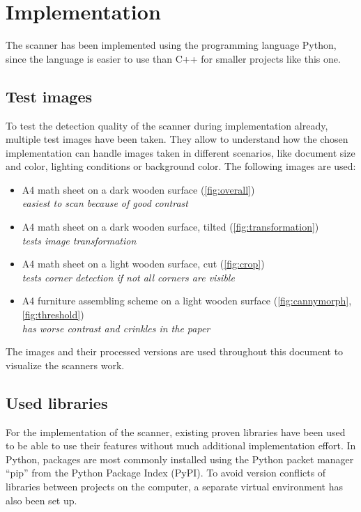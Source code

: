 \chapter{Implementation}
The scanner has been implemented using the programming language Python, since the language is easier to use than C++ for smaller projects like this one.

\section{Test images}
To test the detection quality of the scanner during implementation already, multiple test images have been taken. They allow to understand how the chosen implementation can handle images taken in different scenarios, like document size and color, lighting conditions or background color. The following images are used:

\begin{itemize}
    \item A4 math sheet on a dark wooden surface (\autoref{fig:overall})
    \\ \textit{easiest to scan because of good contrast}
    \item A4 math sheet on a dark wooden surface, tilted (\autoref{fig:transformation})
    \\ \textit{tests image transformation}
    \item A4 math sheet on a light wooden surface, cut (\autoref{fig:crop})
    \\ \textit{tests corner detection if not all corners are visible}
    \item A4 furniture assembling scheme on a light wooden surface (\autoref{fig:cannymorph}, \autoref{fig:threshold})
    \\ \textit{has worse contrast and crinkles in the paper}
\end{itemize}

The images and their processed versions are used throughout this document to visualize the scanners work.

\section{Used libraries}
For the implementation of the scanner, existing proven libraries have been used to be able to use their features without much additional implementation effort. In Python, packages are most commonly installed using the Python packet manager \enquote{pip} from the Python Package Index (PyPI). To avoid version conflicts of libraries between projects on the computer, a separate virtual environment has also been set up.

